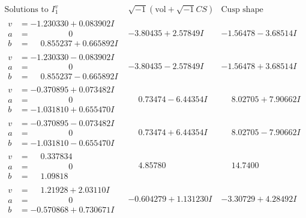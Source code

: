 \documentclass[1p]{elsarticle_modified}
\theoremstyle{definition}
\newcommand{\I}{\sqrt{-1}}
\begin{document}
$$\begin{array}{c|c|c}  
\text{Solutions to }I^v_{1}& \I (\text{vol} + \sqrt{-1}CS) & \text{Cusp shape}\\
 \hline 
\begin{aligned}
v &= -1.230330 + 0.083902 I \\
a &= \phantom{-0.000000 } 0 \\
b &= \phantom{-}0.855237 + 0.665892 I\end{aligned}
 & -3.80435 + 2.57849 I & -1.56478 - 3.68514 I \\ \hline\begin{aligned}
v &= -1.230330 - 0.083902 I \\
a &= \phantom{-0.000000 } 0 \\
b &= \phantom{-}0.855237 - 0.665892 I\end{aligned}
 & -3.80435 - 2.57849 I & -1.56478 + 3.68514 I \\ \hline\begin{aligned}
v &= -0.370895 + 0.073482 I \\
a &= \phantom{-0.000000 } 0 \\
b &= -1.031810 + 0.655470 I\end{aligned}
 & \phantom{-}0.73474 - 6.44354 I & \phantom{-}8.02705 + 7.90662 I \\ \hline\begin{aligned}
v &= -0.370895 - 0.073482 I \\
a &= \phantom{-0.000000 } 0 \\
b &= -1.031810 - 0.655470 I\end{aligned}
 & \phantom{-}0.73474 + 6.44354 I & \phantom{-}8.02705 - 7.90662 I \\ \hline\begin{aligned}
v &= \phantom{-}0.337834\phantom{ +0.000000I} \\
a &= \phantom{-0.000000 } 0 \\
b &= \phantom{-}1.09818\phantom{ +0.000000I}\end{aligned}
 & \phantom{-}4.85780\phantom{ +0.000000I} & \phantom{-}14.7400\phantom{ +0.000000I} \\ \hline\begin{aligned}
v &= \phantom{-}1.21928 + 2.03110 I \\
a &= \phantom{-0.000000 } 0 \\
b &= -0.570868 + 0.730671 I\end{aligned}
 & -0.604279 + 1.131230 I & -3.30729 + 4.28492 I \\ \hline\begin{aligned}

\end{aligned}
\end{array}$$
\end{document}
